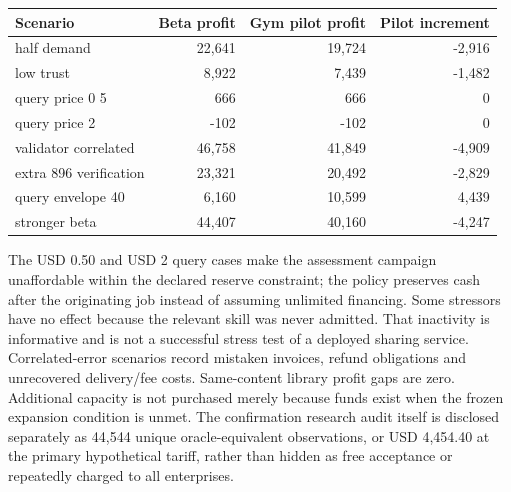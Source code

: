 \begin{center}\small\begin{tabular}{lrrr}
\toprule
Scenario & Beta profit & Gym pilot profit & Pilot increment \\ \midrule
half demand & 22,641 & 19,724 & -2,916 \\
low trust & 8,922 & 7,439 & -1,482 \\
query price 0 5 & 666 & 666 & 0 \\
query price 2 & -102 & -102 & 0 \\
validator correlated & 46,758 & 41,849 & -4,909 \\
extra 896 verification & 23,321 & 20,492 & -2,829 \\
query envelope 40 & 6,160 & 10,599 & 4,439 \\
stronger beta & 44,407 & 40,160 & -4,247 \\
\bottomrule
\end{tabular}\end{center}
The USD 0.50 and USD 2 query cases make the assessment campaign unaffordable within the declared reserve constraint; the policy preserves cash after the originating job instead of assuming unlimited financing. Some stressors have no effect because the relevant skill was never admitted. That inactivity is informative and is not a successful stress test of a deployed sharing service. Correlated-error scenarios record mistaken invoices, refund obligations and unrecovered delivery/fee costs. Same-content library profit gaps are zero. Additional capacity is not purchased merely because funds exist when the frozen expansion condition is unmet. The confirmation research audit itself is disclosed separately as 44,544 unique oracle-equivalent observations, or USD 4,454.40 at the primary hypothetical tariff, rather than hidden as free acceptance or repeatedly charged to all enterprises.
